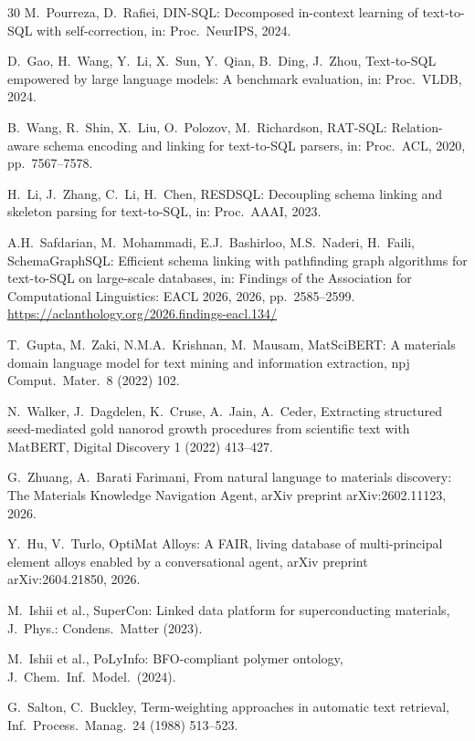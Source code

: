 \documentclass{npj-compt.mater}
\begin{document}
\begin{thebibliography}{30}
M.~Pourreza, D.~Rafiei,
DIN-SQL: Decomposed in-context learning of text-to-SQL with self-correction,
in: Proc.\ NeurIPS, 2024.

D.~Gao, H.~Wang, Y.~Li, X.~Sun, Y.~Qian, B.~Ding, J.~Zhou,
Text-to-SQL empowered by large language models: A benchmark evaluation,
in: Proc.\ VLDB, 2024.

B.~Wang, R.~Shin, X.~Liu, O.~Polozov, M.~Richardson,
RAT-SQL: Relation-aware schema encoding and linking for text-to-SQL parsers,
in: Proc.\ ACL, 2020, pp.~7567--7578.

H.~Li, J.~Zhang, C.~Li, H.~Chen,
RESDSQL: Decoupling schema linking and skeleton parsing for text-to-SQL,
in: Proc.\ AAAI, 2023.

A.H.~Safdarian, M.~Mohammadi, E.J.~Bashirloo, M.S.~Naderi, H.~Faili,
SchemaGraphSQL: Efficient schema linking with pathfinding graph algorithms for text-to-SQL on large-scale databases,
in: Findings of the Association for Computational Linguistics: EACL 2026, 2026, pp.~2585--2599.
\url{https://aclanthology.org/2026.findings-eacl.134/}

T.~Gupta, M.~Zaki, N.M.A.~Krishnan, M.~Mausam,
MatSciBERT: A materials domain language model for text mining and information extraction,
npj Comput.\ Mater.\ 8 (2022) 102.

N.~Walker, J.~Dagdelen, K.~Cruse, A.~Jain, A.~Ceder,
Extracting structured seed-mediated gold nanorod growth procedures from scientific text with MatBERT,
Digital Discovery 1 (2022) 413--427.

G.~Zhuang, A.~Barati Farimani,
From natural language to materials discovery: The Materials Knowledge Navigation Agent,
arXiv preprint arXiv:2602.11123, 2026.

Y.~Hu, V.~Turlo,
OptiMat Alloys: A FAIR, living database of multi-principal element alloys enabled by a conversational agent,
arXiv preprint arXiv:2604.21850, 2026.

M.~Ishii et al.,
SuperCon: Linked data platform for superconducting materials,
J.\ Phys.: Condens.\ Matter (2023).

M.~Ishii et al.,
PoLyInfo: BFO-compliant polymer ontology,
J.\ Chem.\ Inf.\ Model.\ (2024).

G.~Salton, C.~Buckley,
Term-weighting approaches in automatic text retrieval,
Inf.\ Process.\ Manag.\ 24 (1988) 513--523.


\end{thebibliography}
\end{document}
